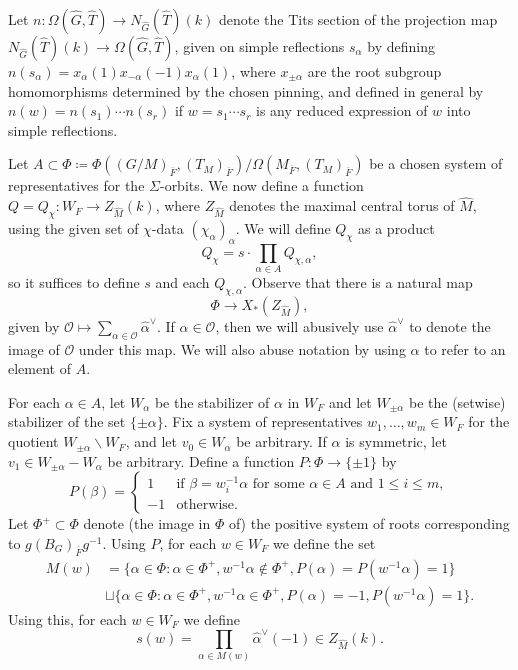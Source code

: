 \documentclass[reqno]{amsart}
\numberwithin{equation}{subsection}
\newcommand{\ol}[1]{\overline{#1}}
\newcommand{\wh}[1]{\widehat{#1}}
\newcommand{\co}{\colon}
\newcommand\cO{\mathcal{O}}
\theoremstyle{remark}
\numberwithin{equation}{subsection}
\numberwithin{figure}{subsection}
\begin{document}
Let $n\co \Omega(\wh G, \wh T) \to N_{\wh G}(\wh T)(k)$ denote the Tits section of the projection map $N_{\wh G}(\wh T)(k) \to \Omega(\wh G, \wh T)$, given on simple reflections $s_\alpha$ by defining $n(s_\alpha) = x_\alpha(1)x_{-\alpha}(-1)x_\alpha(1)$, where $x_{\pm\alpha}$ are the root subgroup homomorphisms determined by the chosen pinning, and defined in general by $n(w) = n(s_1) \cdots n(s_r)$ if $w = s_1 \cdots s_r$ is any reduced expression of $w$ into simple reflections.

Let $A \subset \Phi \coloneqq \Phi((G/M)_{\ol F}, (T_M)_{\ol F})/\Omega(M_{\ol F}, (T_M)_{\ol F})$ be a chosen system of representatives for the $\Sigma$-orbits. We now define a function $Q = Q_\chi\co W_F \to Z_{\wh M}(k)$, where $Z_{\wh M}$ denotes the maximal central torus of $\wh M$, using the given set of $\chi$-data $(\chi_\alpha)_\alpha$. We will define $Q_\chi$ as a product
\[
Q_\chi = s \cdot \prod_{\alpha \in A} Q_{\chi,\alpha},
\]
so it suffices to define $s$ and each $Q_{\chi,\alpha}$. Observe that there is a natural map 
\[
\Phi \to X_*(Z_{\wh M}),
\]
given by $\cO \mapsto \sum_{\alpha \in \cO} \wh\alpha^\vee$. If $\alpha \in \cO$, then we will abusively use $\wh\alpha^\vee$ to denote the image of $\cO$ under this map. We will also abuse notation by using $\alpha$ to refer to an element of $A$.

For each $\alpha \in A$, let $W_\alpha$ be the stabilizer of $\alpha$ in $W_F$ and let $W_{\pm\alpha}$ be the (setwise) stabilizer of the set $\{\pm\alpha\}$. Fix a system of representatives $w_1, \dots, w_m \in W_F$ for the quotient $W_{\pm\alpha}\backslash W_F$, and let $v_0 \in W_\alpha$ be arbitrary. If $\alpha$ is symmetric, let $v_1 \in W_{\pm\alpha} - W_\alpha$ be arbitrary. Define a function $P \co \Phi \to \{\pm 1\}$ by
\[
P(\beta) = \begin{cases}
1 &\text{if } \beta = w_i^{-1}\alpha \text{ for some } \alpha \in A \text{ and } 1\leq i\leq m, \\
-1 &\text{otherwise.}
\end{cases}
\]
Let $\Phi^+ \subset \Phi$ denote (the image in $\Phi$ of) the positive system of roots corresponding to $g(B_G)_{\ol F}g^{-1}$. Using $P$, for each $w \in W_F$ we define the set
\begin{align*}
M(w) &= \{\alpha \in \Phi\co \alpha \in \Phi^+, w^{-1}\alpha \not\in \Phi^+, P(\alpha) = P(w^{-1}\alpha) = 1\} \\
&\sqcup \{\alpha \in \Phi\co \alpha \in \Phi^+, w^{-1}\alpha \in \Phi^+, P(\alpha) = -1, P(w^{-1}\alpha) = 1\}.
\end{align*}
Using this, for each $w \in W_F$ we define
\[
s(w) = \prod_{\alpha \in M(w)} \wh\alpha^\vee(-1) \in Z_{\wh M}(k).
\]
\end{document}
